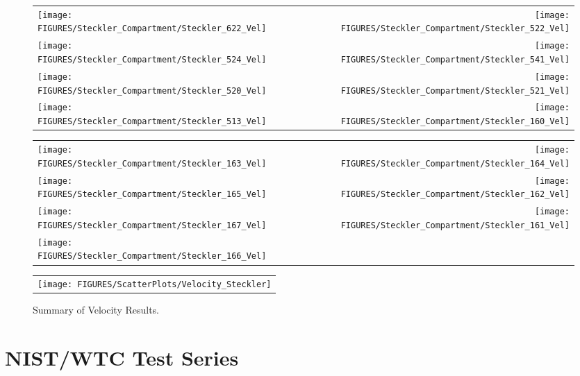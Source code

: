 \begin{figure}[p]
\begin{tabular*}{\textwidth}{l@{\extracolsep{\fill}}r}
\texttt{[image: FIGURES/Steckler\_Compartment/Steckler\_622\_Vel]} &
\texttt{[image: FIGURES/Steckler\_Compartment/Steckler\_522\_Vel]} \\
\texttt{[image: FIGURES/Steckler\_Compartment/Steckler\_524\_Vel]} &
\texttt{[image: FIGURES/Steckler\_Compartment/Steckler\_541\_Vel]} \\
\texttt{[image: FIGURES/Steckler\_Compartment/Steckler\_520\_Vel]} &
\texttt{[image: FIGURES/Steckler\_Compartment/Steckler\_521\_Vel]} \\
\texttt{[image: FIGURES/Steckler\_Compartment/Steckler\_513\_Vel]} &
\texttt{[image: FIGURES/Steckler\_Compartment/Steckler\_160\_Vel]}
\end{tabular*}
\label{Steckler_Vel_6}
\end{figure}

\begin{figure}[p]
\begin{tabular*}{\textwidth}{l@{\extracolsep{\fill}}r}
\texttt{[image: FIGURES/Steckler\_Compartment/Steckler\_163\_Vel]} &
\texttt{[image: FIGURES/Steckler\_Compartment/Steckler\_164\_Vel]} \\
\texttt{[image: FIGURES/Steckler\_Compartment/Steckler\_165\_Vel]} &
\texttt{[image: FIGURES/Steckler\_Compartment/Steckler\_162\_Vel]} \\
\texttt{[image: FIGURES/Steckler\_Compartment/Steckler\_167\_Vel]} &
\texttt{[image: FIGURES/Steckler\_Compartment/Steckler\_161\_Vel]} \\
\texttt{[image: FIGURES/Steckler\_Compartment/Steckler\_166\_Vel]} &

\end{tabular*}
\label{Steckler_Vel_7}
\end{figure}

\begin{figure}[p]
\begin{center}
\begin{tabular}{l}
\texttt{[image: FIGURES/ScatterPlots/Velocity\_Steckler]}
\end{tabular}
\caption{Summary of Velocity Results.}
\end{center}
\end{figure}


\clearpage


\section{NIST/WTC Test Series}

